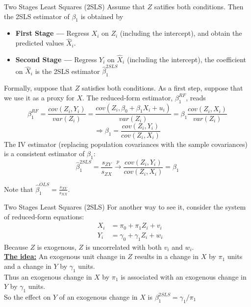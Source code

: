 \documentclass[notes,10pt, aspectratio=169]{beamer}
\begin{document}
\begin{frame}{Two Stages Least Squares (2SLS)}
Assume that $Z$ satifies both conditions. Then the 2SLS estimator of $\beta_1$ is obtained by
\begin{itemize}
    \item \textbf{First Stage ---} Regress $X_i$ on $Z_i$ (including the intercept), and obtain the predicted values $\hat{X}_i$.
    \item \textbf{Second Stage ---} Regress $Y_i$ on $\hat{X}_i$ (including the intercept), the coefficient on $\hat{X}_i$ is the 2SLS estimator $\hat{\beta}_1^{2SLS}$
\end{itemize}
\vspace{0.5em}
Formally, suppose that $Z$ satisfies both conditions. As a first step, suppose that we use it as a proxy for $X$. The reduced-form estimator, $\beta_1^{RF}$, reads
\begin{equation*}
\beta_1^{RF} = \frac{cov(Z_i, Y_i)}{var(Z_i)} = \frac{cov(Z_i, \beta_0 + \beta_1 X_i + u_i)}{var(Z_i)} = \beta_1 \frac{cov(Z_i, X_i)}{var(Z_i)}
\end{equation*}
\begin{equation*}
\Rightarrow \beta_1 = \frac{cov(Z_i, Y_i)}{cov(Z_i, X_i)}
\end{equation*}
The IV estimator (replacing population covariances with the sample covariances) is a consistent estimator of $\beta_1$:
\begin{equation*}
\hat{\beta}_1^{2SLS}= \frac{s_{ZY}}{s_{ZX}} \overset{p}{\to} \frac{cov(Z_i, Y_i)}{cov(Z_i, X_i)} = \beta_1
\end{equation*}
\begin{center}
Note that $\hat{\beta}_1^{OLS}= \frac{s_{XY}}{s_{XX}}$.
\end{center}

\end{frame}

\begin{frame}{Two Stages Least Squares (2SLS)}
For another way to see it, consider the system of reduced-form equations:
\begin{eqnarray*}
    & X_i &= \pi_0 + \pi_1 Z_i + v_i\\
    & Y_i &= \gamma_0 + \gamma_1 Z_i + w_i
\end{eqnarray*}
Because $Z$ is exogenous, $Z$ is uncorrelated with both $v_i$ and $w_i$.\\[1em]
\underline{\textbf{The idea:}} An exogenous unit change in $Z$ results in a change in $X$ by $\pi_1$ units and a change in $Y$ by $\gamma_1$ units.\\[1em]

Thus an exogenous change in  $X$ by $\pi_1$ is associated with an exogenous change in $Y$ by $\gamma_1$ units.\\[1em]

So the effect on $Y$ of an exogenous change in $X$ is $\beta_1^{2SLS} = \gamma_1/\pi_1$
\end{frame}
\end{document}
